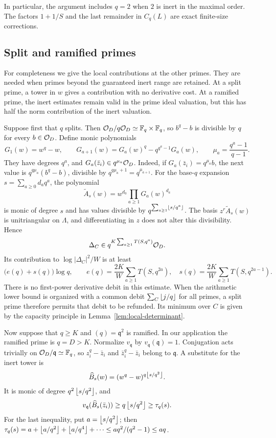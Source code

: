 In particular, the argument includes $q=2$ when $2$ is inert in the maximal
order. The factors $1+1/S$ and the last remainder in $C_q(L)$ are exact
finite-size corrections.

\subsection{Split and ramified primes}
For completeness we give the local contributions at the other primes.
They are needed when primes beyond the guaranteed inert range are retained.
At a split prime, a tower in $w$ gives a contribution with no derivative
cost. At a ramified prime, the inert estimates remain valid in the prime
ideal valuation, but this has half the norm contribution of the inert
valuation.

Suppose first that $q$ splits. Then
$\mathcal O_D/q\mathcal O_D\simeq\mathbb F_q\times\mathbb F_q$, so $b^q-b$ is divisible by $q$
for every $b\in\mathcal O_D$. Define monic polynomials
\[
 G_1(w)=w^q-w,\qquad
 G_{a+1}(w)=G_a(w)^q-q^{q^a-1}G_a(w),\qquad
 \mu_a=\frac{q^a-1}{q-1}.
\]
They have degrees $q^a$, and $G_a(\bar z_i)\in q^{\mu_a}\mathcal O_D$.
Indeed, if $G_a(\bar z_i)=q^{\mu_a}b$, the next value is
$q^{q\mu_a}(b^q-b)$, divisible by $q^{q\mu_a+1}=q^{\mu_{a+1}}$.
For the base-$q$ expansion $s=\sum_{a\geq0}d_aq^a$, the polynomial
\[
 \widetilde A_s(w)=w^{d_0}\prod_{a\geq1}G_a(w)^{d_a}
\]
is monic of degree $s$ and has values divisible by
$q^{\sum_{a\geq1}\left\lfloor s/q^a\right\rfloor}$. The basis
$z^r\widetilde A_s(w)$ is unitriangular on $\Lambda$, and differentiating
in $z$ does not alter this divisibility. Hence
\begin{equation}\label{eq:local-split}
 \Delta_C\in q^{K\sum_{a\geq1}T(S,q^a)}\mathcal O_D.
\end{equation}
Its contribution to $\log|\Delta_C|^2/W$ is at least
\[
 \bigl(e(q)+s(q)\bigr)\log q,\qquad
 e(q)=\frac{2K}{W}\sum_{a\geq1}T(S,q^{2a}),\quad
 s(q)=\frac{2K}{W}\sum_{a\geq1}T(S,q^{2a-1}).
\]
There is no first-power derivative debit in this estimate. When the
arithmetic lower bound is organized with a common debit
$\sum_C\left\lfloor j/q\right\rfloor$ for all primes, a split prime therefore permits that
debit to be refunded. Its minimum over $C$ is given by the capacity
principle in Lemma~\ref{lem:local-determinant}.

Now suppose that $q\geq K$ and $(q)=\mathfrak q^2$ is ramified. In our
application the ramified prime is $q=D>K$. Normalize $v_{\mathfrak q}$
by $v_{\mathfrak q}(\mathfrak q)=1$. Conjugation acts trivially on
$\mathcal O_D/\mathfrak q\simeq\mathbb F_q$, so $z_i^q-\bar z_i$ and
$\bar z_i^q-\bar z_i$ belong to $\mathfrak q$.
A substitute for the inert tower is
\[
 \widehat B_s(w)=(w^q-w)^{q\left\lfloor s/q^2\right\rfloor}.
\]
It is monic of degree $q^2\left\lfloor s/q^2\right\rfloor$, and
\[
 v_{\mathfrak q}(\widehat B_s(\bar z_i))
 \geq q\left\lfloor s/q^2\right\rfloor\geq\tau_q(s).
\]
For the last inequality, put $a=\left\lfloor s/q^2\right\rfloor$; then
$\tau_q(s)=a+\left\lfloor a/q^2\right\rfloor+\left\lfloor a/q^4\right\rfloor+\cdots
\leq aq^2/(q^2-1)\leq aq$.

